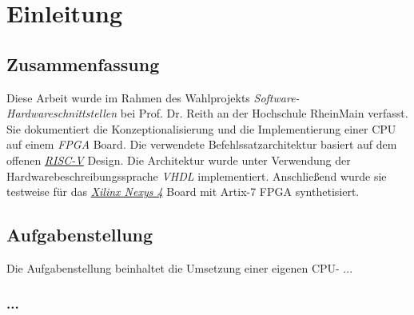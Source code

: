 \chapter{Einleitung} %
\label{Einleitung} %


\newcommand{\keyword}[1]{\textbf{#1}}
\newcommand{\tabhead}[1]{\textbf{#1}}
\newcommand{\code}[1]{\texttt{#1}}
\newcommand{\file}[1]{\texttt{\bfseries#1}}
\newcommand{\option}[1]{\texttt{\itshape#1}}

\section{Zusammenfassung}
Diese Arbeit wurde im Rahmen des Wahlprojekts \textit{Software- Hardwareschnittstellen} bei Prof. Dr. Reith an der Hochschule RheinMain verfasst. Sie dokumentiert die Konzeptionalisierung und die Implementierung einer CPU auf einem \textit{FPGA} Board. Die verwendete Befehlssatzarchitektur basiert auf dem offenen \textit{\href{https://riscv.org/}{RISC-V}} Design. Die Architektur wurde unter Verwendung der Hardwarebeschreibungssprache \textit{VHDL} implementiert. Anschließend wurde sie testweise für das \textit{\href{https://reference.digilentinc.com/reference/programmable-logic/nexys-4/start}{Xilinx Nexys 4\textsuperscript{\textregistered}}}
 Board mit Artix-7\textsuperscript{\textregistered} FPGA synthetisiert.\\
 
\section{Aufgabenstellung}
Die Aufgabenstellung beinhaltet die Umsetzung einer eigenen CPU- ... \cite{Ashenden:609207}

\subsection{...}
